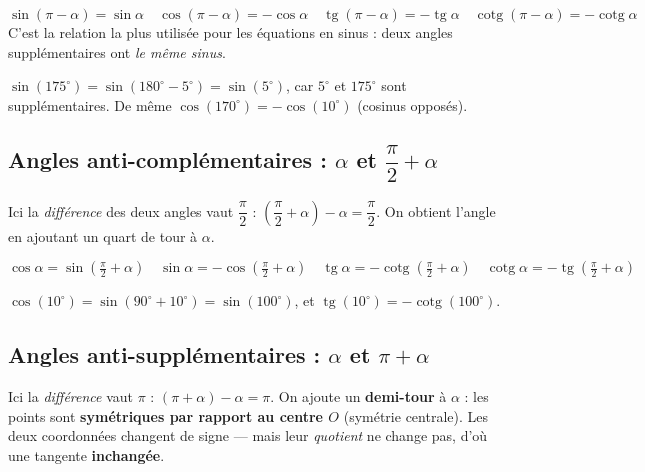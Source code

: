 \documentclass[11pt,a4paper]{article}
\DeclareMathOperator{\tg}{tg}        %
\DeclareMathOperator{\cotg}{cotg}    %
\newcommand{\degr}{^{\circ}}
\begin{document}
\begin{formule}
\[
\boxed{\sin(\pi-\alpha)=\sin\alpha}\quad
\boxed{\cos(\pi-\alpha)=-\cos\alpha}\quad
\boxed{\tg(\pi-\alpha)=-\tg\alpha}\quad
\boxed{\cotg(\pi-\alpha)=-\cotg\alpha}
\]
C'est la relation la plus utilisée pour les équations en sinus : deux angles supplémentaires ont
\emph{le même sinus}.
\end{formule}

\begin{exemple}
$\sin(175\degr)=\sin(180\degr-5\degr)=\sin(5\degr)$, car $5\degr$ et $175\degr$ sont supplémentaires.
De même $\cos(170\degr)=-\cos(10\degr)$ (cosinus opposés).
\end{exemple}

\subsection{Angles anti-complémentaires : $\alpha$ et $\dfrac{\pi}{2}+\alpha$}
Ici la \emph{différence} des deux angles vaut $\dfrac{\pi}{2}$ : $\left(\dfrac{\pi}{2}+\alpha\right)-\alpha=\dfrac{\pi}{2}$.
On obtient l'angle en ajoutant un quart de tour à $\alpha$.

\begin{formule}
\[
\boxed{\cos\alpha=\sin\!\left(\tfrac{\pi}{2}+\alpha\right)}\quad
\boxed{\sin\alpha=-\cos\!\left(\tfrac{\pi}{2}+\alpha\right)}\quad
\boxed{\tg\alpha=-\cotg\!\left(\tfrac{\pi}{2}+\alpha\right)}\quad
\boxed{\cotg\alpha=-\tg\!\left(\tfrac{\pi}{2}+\alpha\right)}
\]
\end{formule}

\begin{exemple}
$\cos(10\degr)=\sin(90\degr+10\degr)=\sin(100\degr)$, et $\tg(10\degr)=-\cotg(100\degr)$.
\end{exemple}

\subsection{Angles anti-supplémentaires : $\alpha$ et $\pi+\alpha$}
Ici la \emph{différence} vaut $\pi$ : $(\pi+\alpha)-\alpha=\pi$. On ajoute un \textbf{demi-tour} à
$\alpha$ : les points sont \textbf{symétriques par rapport au centre $O$} (symétrie centrale).
Les deux coordonnées changent de signe --- mais leur \emph{quotient} ne change pas, d'où une
tangente \textbf{inchangée}.
\end{document}
